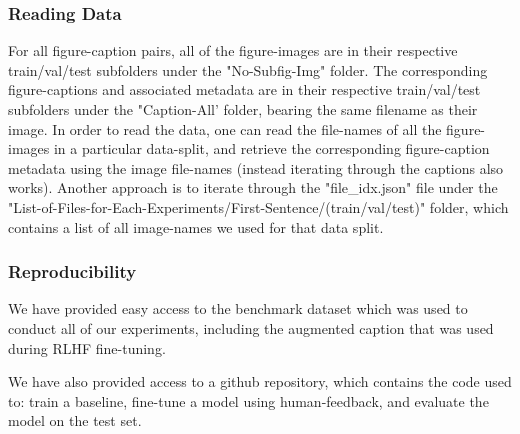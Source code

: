\documentclass[11pt]{article}
\begin{document}
\subsubsection{Reading Data}
For all figure-caption pairs, all of the figure-images are in their respective train/val/test subfolders under the "No-Subfig-Img" folder. The corresponding figure-captions and associated metadata are in their respective train/val/test subfolders under the "Caption-All' folder, bearing the same filename as their image. In order to read the data, one can read the file-names of all the figure-images in a particular data-split, and retrieve the corresponding figure-caption metadata using the image file-names (instead iterating through the captions also works). Another approach is to iterate through the "file\_idx.json" file under the "List-of-Files-for-Each-Experiments/First-Sentence/(train/val/test)"  folder, which contains a list of all image-names we used for that data split. 

\subsubsection{Reproducibility}

We have provided easy access to the benchmark dataset which was used to conduct all of our experiments, including the augmented caption that was used during RLHF fine-tuning. 

We have also provided access to a github repository, which contains the code used to: train a baseline,  fine-tune a model using human-feedback, and evaluate the model on the test set. 
\end{document}

